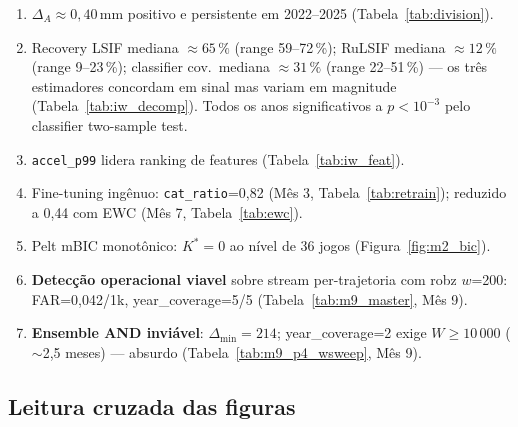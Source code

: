 \documentclass[11pt,a4paper]{article}
\begin{document}
\begin{enumerate}[leftmargin=1.6em,itemsep=2pt]
    \item $\Delta_A \approx 0{,}40$\,mm positivo e persistente em
          2022--2025 (Tabela~\ref{tab:division}).
    \item Recovery LSIF mediana $\approx 65\,\%$ (range 59--72\,\%);
          RuLSIF mediana $\approx 12\,\%$ (range 9--23\,\%);
          classifier cov.\ mediana $\approx 31\,\%$ (range 22--51\,\%) ---
          os tr\^es estimadores concordam em sinal mas variam em
          magnitude (Tabela~\ref{tab:iw_decomp}). Todos os anos
          significativos a $p\!<\!10^{-3}$ pelo classifier two-sample test.
    \item \texttt{accel\_p99} lidera ranking de features
          (Tabela~\ref{tab:iw_feat}).
    \item Fine-tuning ing\^enuo: \texttt{cat\_ratio}=0{,}82 (M\^es 3,
          Tabela~\ref{tab:retrain}); reduzido a 0{,}44 com EWC
          (M\^es 7, Tabela~\ref{tab:ewc}).
    \item Pelt mBIC monot\^onico: $K^*\!=\!0$ ao n\'ivel de 36 jogos
          (Figura~\ref{fig:m2_bic}).
    \item \textbf{Detec\c{c}\~ao operacional viavel} sobre stream
          per-trajetoria com robz $w$=200: FAR=0{,}042/1k,
          year\_coverage=5/5 (Tabela~\ref{tab:m9_master}, M\^es 9).
    \item \textbf{Ensemble AND invi\'avel}: $\Delta_{\min}\!=\!214$;
          year\_coverage=2 exige $W\!\geq\!10\,000$ ($\sim$2{,}5 meses)
          --- absurdo (Tabela~\ref{tab:m9_p4_wsweep}, M\^es 9).
\end{enumerate}

\subsection{Leitura cruzada das figuras}
\end{document}
